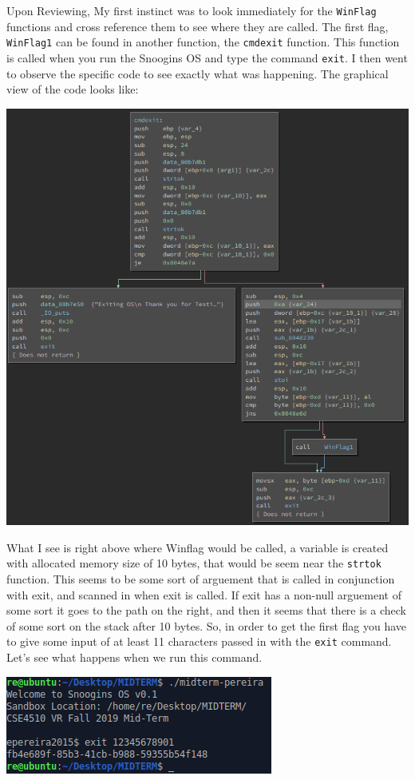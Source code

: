 \documentclass[12pt]{article}
\newcommand\tab[1][0.5cm]{\hspace*{#1}}
\begin{document}
\tab Upon Reviewing, My first instinct was to look immediately for the \texttt{WinFlag} functions and cross reference
them to see where they are called. The first flag, \texttt{WinFlag1} can be found in another function, the \texttt{cmdexit}
function. This function is called when you run the Snoogins OS and type the command \texttt{exit}. I then went to observe the 
specific code to see exactly what was happening. The graphical view of the code looks like:
\begin{center}
	\includegraphics[scale=.46]{photos/winflagone.png}
\end{center}

What I see is right above where Winflag would be called, a variable is created with allocated memory size of 10 bytes, that would
be seem near the \texttt{strtok} function. This seems to be some sort of arguement that is called in conjunction with exit, 
and scanned in when exit is called. If exit has a non-null arguement of some sort it goes to the path on the right, and then
it seems that there is a check of some sort on the stack after 10 bytes. So, in order to get the first flag you have to give some
input of at least 11 characters passed in with the \texttt{exit} command. Let's see what happens when we run this command. 
\begin{center}
	\includegraphics[scale=1]{photos/winflag1.png}
\end{center}
\end{document}

